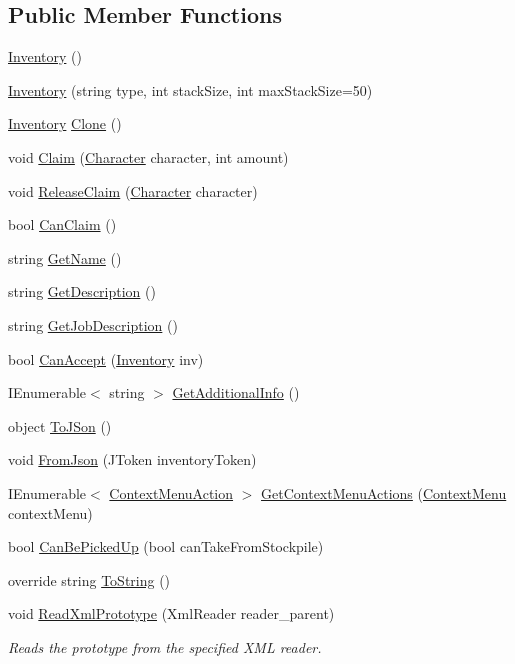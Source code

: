 \subsection*{Public Member Functions}
\begin{DoxyCompactItemize}
\item 
\hyperlink{class_inventory_ab6c0bebea51f2ddf2015cf78b8b4aca1}{Inventory} ()
\item 
\hyperlink{class_inventory_a61d08071c428945e872ef87c0c2e2823}{Inventory} (string type, int stack\+Size, int max\+Stack\+Size=50)
\item 
\hyperlink{class_inventory}{Inventory} \hyperlink{class_inventory_a1f887c1fe8e885cdf64db0a4f57086c1}{Clone} ()
\item 
void \hyperlink{class_inventory_a19ba4679b788734eeb5f5d752d0b55a0}{Claim} (\hyperlink{class_project_porcupine_1_1_entities_1_1_character}{Character} character, int amount)
\item 
void \hyperlink{class_inventory_a3f0c0fdb89b16a036ad6a6f73021a906}{Release\+Claim} (\hyperlink{class_project_porcupine_1_1_entities_1_1_character}{Character} character)
\item 
bool \hyperlink{class_inventory_a689d3f5140a9dccf4c783f190634bbe8}{Can\+Claim} ()
\item 
string \hyperlink{class_inventory_a627326dce64285113303015d25a80fd0}{Get\+Name} ()
\item 
string \hyperlink{class_inventory_abd4b4e47544f6697bcec6fea62b80fe2}{Get\+Description} ()
\item 
string \hyperlink{class_inventory_a4781e2a97ef39ee9e137d64c819c7f8a}{Get\+Job\+Description} ()
\item 
bool \hyperlink{class_inventory_a07fdb83a12132708e4435914346dade2}{Can\+Accept} (\hyperlink{class_inventory}{Inventory} inv)
\item 
I\+Enumerable$<$ string $>$ \hyperlink{class_inventory_a6cf01d5205fb424105c869f28ad66f79}{Get\+Additional\+Info} ()
\item 
object \hyperlink{class_inventory_af242e454f4f434098177fcea0f56214c}{To\+J\+Son} ()
\item 
void \hyperlink{class_inventory_ad7a75289736a8fd3b0c036e9d79e0079}{From\+Json} (J\+Token inventory\+Token)
\item 
I\+Enumerable$<$ \hyperlink{class_context_menu_action}{Context\+Menu\+Action} $>$ \hyperlink{class_inventory_aa7f9e191f5d4e2cdb012d3de59f2eacf}{Get\+Context\+Menu\+Actions} (\hyperlink{class_context_menu}{Context\+Menu} context\+Menu)
\item 
bool \hyperlink{class_inventory_ae36dfb1d29316cd8dc4e7d8bda8c60f8}{Can\+Be\+Picked\+Up} (bool can\+Take\+From\+Stockpile)
\item 
override string \hyperlink{class_inventory_ade6e157a03985e91c6f00881e423d058}{To\+String} ()
\item 
void \hyperlink{class_inventory_aac854a42e73fd7d0fa04ba3581cc339b}{Read\+Xml\+Prototype} (Xml\+Reader reader\+\_\+parent)
\begin{DoxyCompactList}\small\item\em Reads the prototype from the specified X\+ML reader. \end{DoxyCompactList}\end{DoxyCompactItemize}
